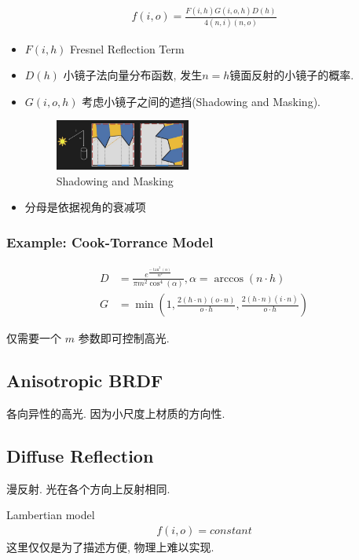 \begin{align*}
    f(i,o)=\frac{F(i,h)G(i,o,h)D(h)}{4(n,i)(n,o)}
\end{align*}

\begin{itemize}
    \item $F(i,h)$ Fresnel Reflection Term
    \item $D(h)$ 小镜子法向量分布函数, 发生$n=h$镜面反射的小镜子的概率. 
    \item $G(i,o,h)$ 考虑小镜子之间的遮挡(Shadowing and Masking).
    \begin{figure}[!htb]
        \centering
        \includegraphics[width=0.42\textwidth]{pic/ACG4/Shadowing and Masking}
        \caption{Shadowing and Masking}
    \end{figure}
    \item 分母是依据视角的衰减项
\end{itemize}

\subsubsection{Example: Cook-Torrance Model}
\begin{align*}
    D&= \frac{e^{\frac{-\tan^2(\alpha)}{m^2}}}{\pi m^2\cos^4 (\alpha)}, \alpha = \arccos(n\cdot h)\\
    G&= \min\left( 1, \frac{2(h\cdot n)(o\cdot n)}{o\cdot h}, \frac{2(h\cdot n)(i\cdot n)}{o\cdot h} \right)
\end{align*}

仅需要一个 $m$ 参数即可控制高光.

\subsection{Anisotropic BRDF}
各向异性的高光. 因为小尺度上材质的方向性.

\subsection{Diffuse Reflection}
漫反射. 光在各个方向上反射相同. 

Lambertian model
\begin{align*}
    f(i,o)=constant
\end{align*}
这里仅仅是为了描述方便, 物理上难以实现. 

